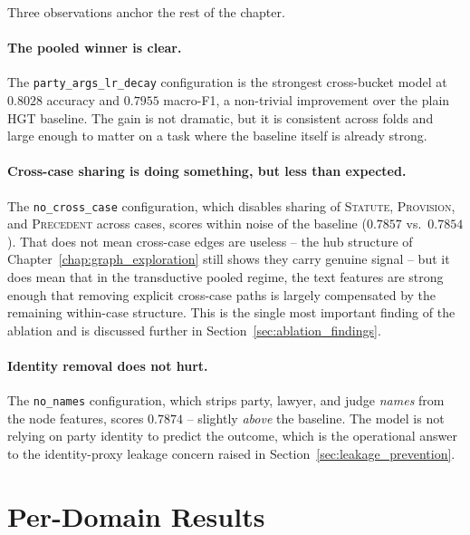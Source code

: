 Three observations anchor the rest of the chapter.

\paragraph{The pooled winner is clear.} The
\texttt{party\_args\_lr\_decay} configuration is the strongest
cross-bucket model at $0.8028$ accuracy and $0.7955$ macro-F1, a
non-trivial improvement over the plain HGT baseline. The gain is not
dramatic, but it is consistent across folds and large enough to matter
on a task where the baseline itself is already strong.

\paragraph{Cross-case sharing is doing something, but less than
expected.} The \texttt{no\_cross\_case} configuration, which disables
sharing of \textsc{Statute}, \textsc{Provision}, and \textsc{Precedent}
across cases, scores within noise of the baseline ($0.7857$ vs.\
$0.7854$). That does not mean cross-case edges are useless -- the hub
structure of Chapter~\ref{chap:graph_exploration} still shows they
carry genuine signal -- but it does mean that in the transductive
pooled regime, the text features are strong enough that removing
explicit cross-case paths is largely compensated by the remaining
within-case structure. This is the single most important finding of
the ablation and is discussed further in
Section~\ref{sec:ablation_findings}.

\paragraph{Identity removal does not hurt.} The \texttt{no\_names}
configuration, which strips party, lawyer, and judge \emph{names}
from the node features, scores $0.7874$ -- slightly \emph{above} the
baseline. The model is not relying on party identity to predict the
outcome, which is the operational answer to the identity-proxy
leakage concern raised in Section~\ref{sec:leakage_prevention}.

\section{Per-Domain Results}

